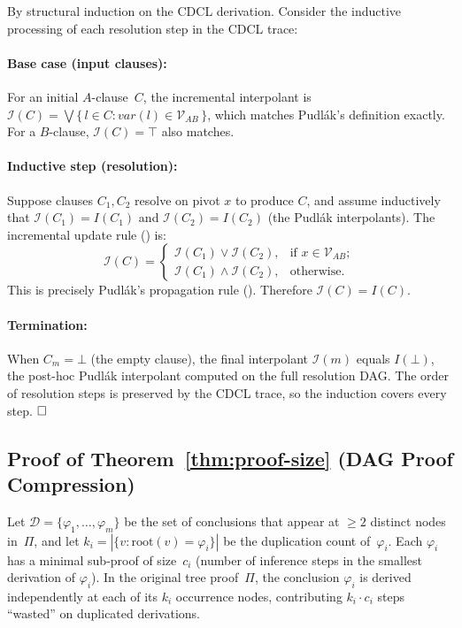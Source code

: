 \documentclass[acmtocl,review,anonymous]{acmart}
\begin{document}
By structural induction on the CDCL derivation.  Consider the
inductive processing of each resolution step in the CDCL trace:

\paragraph{Base case (input clauses):}
For an initial $A$-clause~$C$, the incremental interpolant is
$\mathcal{I}(C) = \bigvee\{\,l \in C : \mathit{var}(l) \in
  \mathcal{V}_{AB}\,\}$, which matches Pudl\'{a}k's definition
exactly.  For a $B$-clause, $\mathcal{I}(C) = \top$ also matches.

\paragraph{Inductive step (resolution):}
Suppose clauses $C_1, C_2$ resolve on pivot $x$ to produce $C$,
and assume inductively that
$\mathcal{I}(C_1) = I(C_1)$ and $\mathcal{I}(C_2) = I(C_2)$
(the Pudl\'{a}k interpolants).  The incremental update rule
() is:
\[
  \mathcal{I}(C) =
  \begin{cases}
    \mathcal{I}(C_1) \lor \mathcal{I}(C_2),
      & \text{if } x \in \mathcal{V}_{AB}; \\
    \mathcal{I}(C_1) \land \mathcal{I}(C_2),
      & \text{otherwise}.
  \end{cases}
\]
This is precisely Pudl\'{a}k's propagation rule
().  Therefore
$\mathcal{I}(C) = I(C)$.

\paragraph{Termination:} When $C_m = \bot$ (the empty clause),
the final interpolant $\mathcal{I}(m)$ equals $I(\bot)$, the post-hoc
Pudl\'{a}k interpolant computed on the full resolution DAG.  The order
of resolution steps is preserved by the CDCL trace, so the induction
covers every step.  $\hfill\square$

\subsection{Proof of Theorem~\ref{thm:proof-size}
  (DAG Proof Compression)}

Let $\mathcal{D} = \{\varphi_1, \ldots, \varphi_m\}$ be the set of
conclusions that appear at $\geq 2$ distinct nodes in~$\Pi$, and let
$k_i = |\{v : \mathrm{root}(v) = \varphi_i\}|$ be the duplication count
of~$\varphi_i$.  Each $\varphi_i$ has a minimal sub-proof of
size~$c_i$ (number of inference steps in the smallest derivation of
$\varphi_i$).  In the original tree proof~$\Pi$, the conclusion
$\varphi_i$ is derived independently at each of its $k_i$ occurrence
nodes, contributing $k_i \cdot c_i$ steps ``wasted'' on duplicated
derivations.
\end{document}
